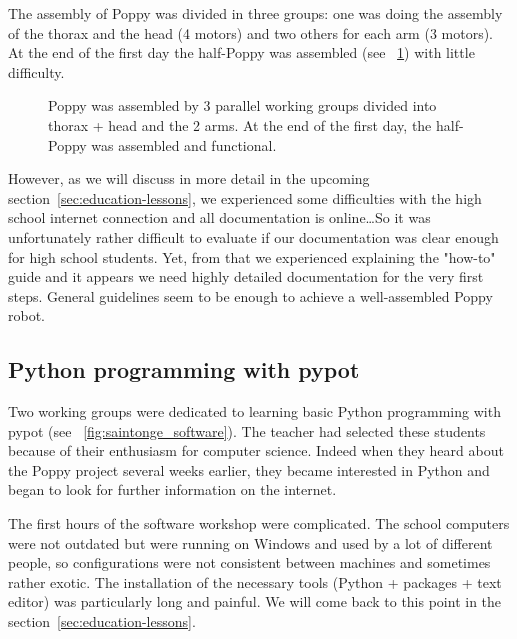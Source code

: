 The assembly of Poppy was divided in three groups: one was doing the assembly of the thorax and the head (4 motors) and two others for each arm (3 motors). At the end of the first day the half-Poppy was assembled (see \figurename~\ref{fig:saintonge_assembly}) with little difficulty.

\begin{figure}[tb]
\centering
    \hfill
    \hfill
    \hfill
    \caption{Poppy was assembled by 3 parallel working groups divided into thorax + head and the 2 arms. At the end of the first day, the half-Poppy was assembled and functional. }
    \label{fig:saintonge_assembly}
\end{figure}

However, as we will discuss in more detail in the upcoming section~\ref{sec:education-lessons}, we experienced some difficulties with the high school internet connection and all documentation is online\dots So it was unfortunately rather difficult to evaluate if our documentation was clear enough for high school students. Yet, from that we experienced explaining the "how-to" guide and it appears we need highly detailed documentation for the very first steps. General guidelines seem to be enough to achieve a well-assembled Poppy robot.

\subsection{Python programming with pypot}

Two working groups were dedicated to learning basic Python programming with pypot (see \figurename~\ref{fig:saintonge_software}). The teacher had selected these students because of their enthusiasm for computer science. Indeed when they heard about the Poppy project several weeks earlier, they became interested in Python and began to look for further information on the internet.

The first hours of the software workshop were complicated. The school computers were not outdated but were running on Windows and used by a lot of different people, so configurations were not consistent between machines and sometimes rather exotic. The installation of the necessary tools (Python + packages + text editor) was particularly long and painful. We will come back to this point in the section~\ref{sec:education-lessons}.

